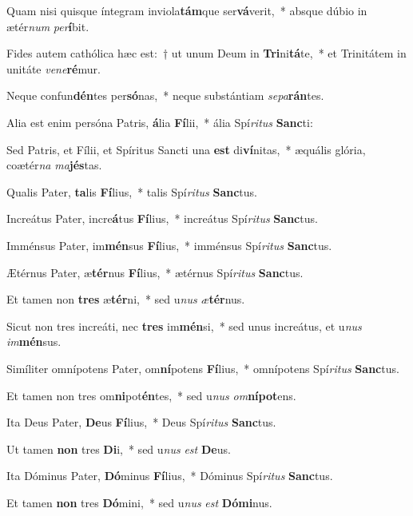 \item Quam nisi quisque íntegram inviola\textbf{tám}que ser\textbf{vá}verit,~* absque dúbio in ætér\textit{num} \textit{per}\textbf{í}bit.
\item Fides autem cathólica hæc est:~† ut unum Deum in \textbf{Tri}ni\textbf{tá}te,~* et Trinitátem in unitáte \textit{ve}\textit{ne}\textbf{ré}mur.
\item Neque confun\textbf{dén}tes per\textbf{só}nas,~* neque substántiam \textit{se}\textit{pa}\textbf{rán}tes.
\item Alia est enim persóna Patris, \textbf{á}lia \textbf{Fí}lii,~* ália Spí\textit{ri}\textit{tus} \textbf{Sanc}ti:
\item Sed Patris, et Fílii, et Spíritus Sancti una \textbf{est} di\textbf{ví}nitas,~* æquális glória, coætér\textit{na} \textit{ma}\textbf{jés}tas.
\item Qualis Pater, \textbf{ta}lis \textbf{Fí}lius,~* talis Spí\textit{ri}\textit{tus} \textbf{Sanc}tus.
\item Increátus Pater, incre\textbf{á}tus \textbf{Fí}lius,~* increátus Spí\textit{ri}\textit{tus} \textbf{Sanc}tus.
\item Imménsus Pater, im\textbf{mén}sus \textbf{Fí}lius,~* imménsus Spí\textit{ri}\textit{tus} \textbf{Sanc}tus.
\item Ætérnus Pater, æ\textbf{tér}nus \textbf{Fí}lius,~* ætérnus Spí\textit{ri}\textit{tus} \textbf{Sanc}tus.
\item Et tamen non \textbf{tres} æ\textbf{tér}ni,~* sed u\textit{nus} \textit{æ}\textbf{tér}nus.
\item Sicut non tres increáti, nec \textbf{tres} im\textbf{mén}si,~* sed unus increátus, et u\textit{nus} \textit{im}\textbf{mén}sus.
\item Simíliter omnípotens Pater, om\textbf{ní}potens \textbf{Fí}lius,~* omnípotens Spí\textit{ri}\textit{tus} \textbf{Sanc}tus.
\item Et tamen non tres om\textbf{ni}pot\textbf{én}tes,~* sed u\textit{nus} \textit{om}\textbf{ní}\textbf{pot}ens.
\item Ita Deus Pater, \textbf{De}us \textbf{Fí}lius,~* Deus Spí\textit{ri}\textit{tus} \textbf{Sanc}tus.
\item Ut tamen \textbf{non} tres \textbf{Di}i,~* sed u\textit{nus} \textit{est} \textbf{De}us.
\item Ita Dóminus Pater, \textbf{Dó}minus \textbf{Fí}lius,~* Dóminus Spí\textit{ri}\textit{tus} \textbf{Sanc}tus.
\item Et tamen \textbf{non} tres \textbf{Dó}mini,~* sed u\textit{nus} \textit{est} \textbf{Dó}\textbf{mi}nus.

